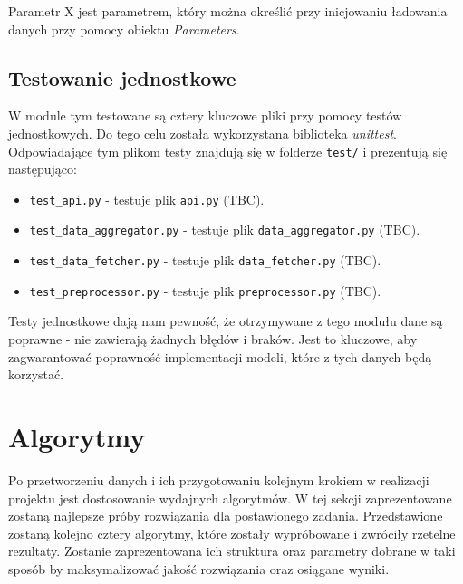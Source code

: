         \noindent Parametr X jest parametrem, który można określić przy inicjowaniu ładowania danych przy pomocy obiektu \emph{Parameters}.
        
        \subsection{Testowanie jednostkowe}
        \noindent W module tym testowane są cztery kluczowe pliki przy pomocy testów jednostkowych. Do tego celu została wykorzystana biblioteka \emph{unittest}. Odpowiadające tym plikom testy znajdują się w folderze \texttt{test/} i prezentują się następująco:
        
        \begin{itemize}
            \item \texttt{test\_api.py} - testuje plik \texttt{api.py} (TBC).
            \item \texttt{test\_data\_aggregator.py} - testuje plik \texttt{data\_aggregator.py} (TBC).
            \item \texttt{test\_data\_fetcher.py} - testuje plik \texttt{data\_fetcher.py} (TBC).
            \item \texttt{test\_preprocessor.py} - testuje plik \texttt{preprocessor.py} (TBC).
        \end{itemize}
        
        Testy jednostkowe dają nam pewność, że otrzymywane z tego modułu dane są poprawne - nie zawierają żadnych błędów i braków. Jest to kluczowe, aby zagwarantować poprawność implementacji modeli, które z tych danych będą korzystać.
        
    \section{Algorytmy}
    Po przetworzeniu danych i ich przygotowaniu kolejnym krokiem w realizacji projektu jest dostosowanie wydajnych algorytmów. W tej sekcji zaprezentowane zostaną najlepsze próby rozwiązania dla postawionego zadania. Przedstawione zostaną kolejno cztery algorytmy, które zostały wypróbowane i zwróciły rzetelne rezultaty. Zostanie zaprezentowana ich struktura oraz parametry dobrane w taki sposób by maksymalizować jakość rozwiązania oraz osiągane wyniki.

